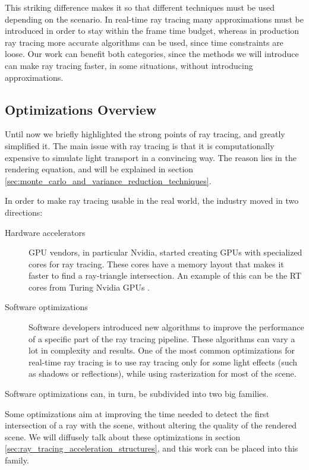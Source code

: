 \documentclass{PoliMi_MasterThesis}
\begin{document}
This striking difference makes it so that different techniques must be used depending on the scenario. In real-time ray tracing many approximations must be introduced in order to stay within the frame time budget, whereas in production ray tracing more accurate algorithms can be used, since time constraints are loose. Our work can benefit both categories, since the methods we will introduce can make ray tracing faster, in some situations, without introducing approximations.

\subsection{Optimizations Overview} \label{ssec:optimizations_overview}
Until now we briefly highlighted the strong points of ray tracing, and greatly simplified it. The main issue with ray tracing is that it is computationally expensive to simulate light transport in a convincing way. The reason lies in the rendering equation, and will be explained in section \ref{sec:monte_carlo_and_variance_reduction_techniques}.

In order to make ray tracing usable in the real world, the industry moved in two directions:
\begin{description}
	\item [Hardware accelerators] GPU vendors, in particular Nvidia, started creating GPUs with specialized cores for ray tracing. These cores have a memory layout that makes it faster to find a ray-triangle intersection. An example of this can be the RT cores from Turing Nvidia GPUs \cite{rt_cores}.
	\item [Software optimizations] Software developers introduced new algorithms to improve the performance of a specific part of the ray tracing pipeline. These algorithms can vary a lot in complexity and results. One of the most common optimizations for real-time ray tracing is to use ray tracing only for some light effects (such as shadows or reflections), while using rasterization for most of the scene.
\end{description}

Software optimizations can, in turn, be subdivided into two big families.

Some optimizations aim at improving the time needed to detect the first intersection of a ray with the scene, without altering the quality of the rendered scene. We will diffusely talk about these optimizations in section \ref{sec:ray_tracing_acceleration_structures}, and this work can be placed into this family.
\end{document}
